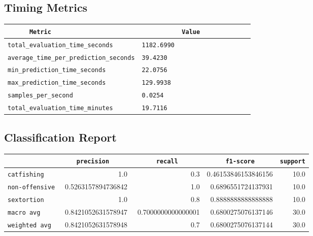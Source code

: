 \documentclass{article}
\begin{document}
\subsection{Timing Metrics}

\begin{center}
\begin{tabular}{l | l} \hline
    \verb|      Metric     | & \verb|           Value           | \\ \hline
    \hline
    \verb|total_evaluation_time_seconds| & \verb|1182.6990                    | \\ \hline
    \verb|average_time_per_prediction_seconds| & \verb|39.4230                      | \\ \hline
    \verb|min_prediction_time_seconds| & \verb|22.0756                      | \\ \hline
    \verb|max_prediction_time_seconds| & \verb|129.9938                     | \\ \hline
    \verb|samples_per_second| & \verb|0.0254                       | \\ \hline
    \verb|total_evaluation_time_minutes| & \verb|19.7116                      | \\ \hline
\end{tabular}
\end{center}

\subsection{Classification Report}

\begin{center}
\begin{tabular}{l | r | r | r | r} \hline
    \verb|            | & \verb|    precision     | & \verb|      recall      | & \verb|     f1-score     | & \verb|support| \\ \hline
    \hline
    \verb|catfishing | & 1.0 & 0.3 & 0.46153846153846156 &    10.0 \\ \hline
    \verb|non-offensive| & 0.5263157894736842 & 1.0 & 0.6896551724137931 &    10.0 \\ \hline
    \verb|sextortion | & 1.0 & 0.8 & 0.8888888888888888 &    10.0 \\ \hline
    \verb|macro avg  | & 0.8421052631578947 & 0.7000000000000001 & 0.6800275076137146 &    30.0 \\ \hline
    \verb|weighted avg| & 0.8421052631578948 & 0.7 & 0.6800275076137144 &    30.0 \\ \hline
\end{tabular}
\end{center}
\end{document}
